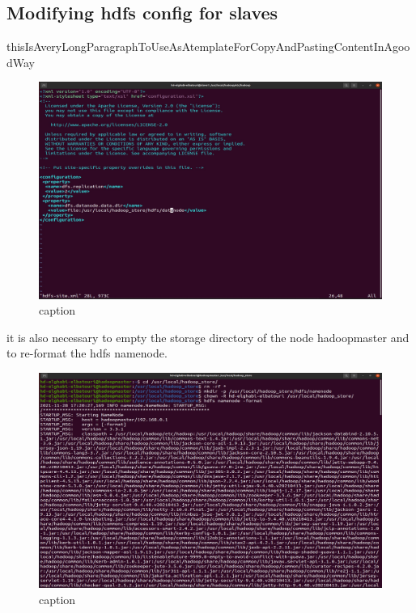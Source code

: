 \begin{spacing}{1.2}
\section{Modifying hdfs config for slaves}

\par thisIsAveryLongParagraphToUseAsAtemplateForCopyAndPastingContentInAgoodWay
\\
\begin{figure}[!htb] 
\begin{center} 
\includegraphics[width=1\linewidth]{Big_Data/Hadoop/Multi-Nodes Cluster/Modifying hdfs config for slaves.jpg} 
\end{center} 
\caption{caption} 
\end{figure} 
\FloatBarrier

\par it is also necessary to empty the storage directory of the node hadoopmaster and to re-format the hdfs namenode.
\\
\begin{figure}[!htb] 
\begin{center} 
\includegraphics[width=1\linewidth]{Big_Data/Hadoop/Multi-Nodes Cluster/Formatting hadoopmaster namenode.jpg} 
\end{center} 
\caption{caption} 
\end{figure} 
\FloatBarrier



\end{spacing}
